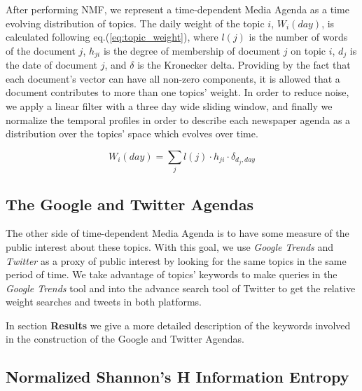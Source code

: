\documentclass{bmcart}
\begin{document}
\par After performing NMF, we represent a time-dependent Media Agenda as a time evolving distribution of topics. The daily weight of the topic $i$, $W_i(day)$, is calculated following  eq.(\ref{eq:topic_weight}), where $l(j)$ is the number of words of the document $j$, $h_{ji}$ is the degree of membership of document $j$ on topic $i$, $d_j$ is the date of document $j$, and $\delta$ is the Kronecker delta. Providing by the fact that each document's vector can have all non-zero components, it is allowed that a document contributes to more than one topics' weight.
In order to reduce noise, we apply a linear filter with a three day wide sliding window, and finally we normalize the temporal profiles in order to describe each newspaper agenda as a distribution over the topics' space which evolves over time. 

\begin{equation}
W_i(day) = \sum_j l(j) \cdot h_{ji} \cdot \delta_{d_j,day}
\label{eq:topic_weight}
\end{equation}

\subsection*{The Google and Twitter Agendas}
 
\par The other side of time-dependent Media Agenda is to have some measure of the public interest about these topics. With this goal, we use  \emph{Google Trends} and \emph{Twitter} as a proxy of public interest by  looking for the same topics  in the same period of time. We take advantage of topics' keywords to make queries in the \emph{Google Trends}  tool and  into the advance search tool of Twitter  to get the relative weight searches and tweets in both platforms.
\par In section \textbf{Results} we give a more detailed description of the keywords involved in the construction of the Google and Twitter Agendas. 

\subsection*{Normalized Shannon's H Information Entropy}
\end{document}
